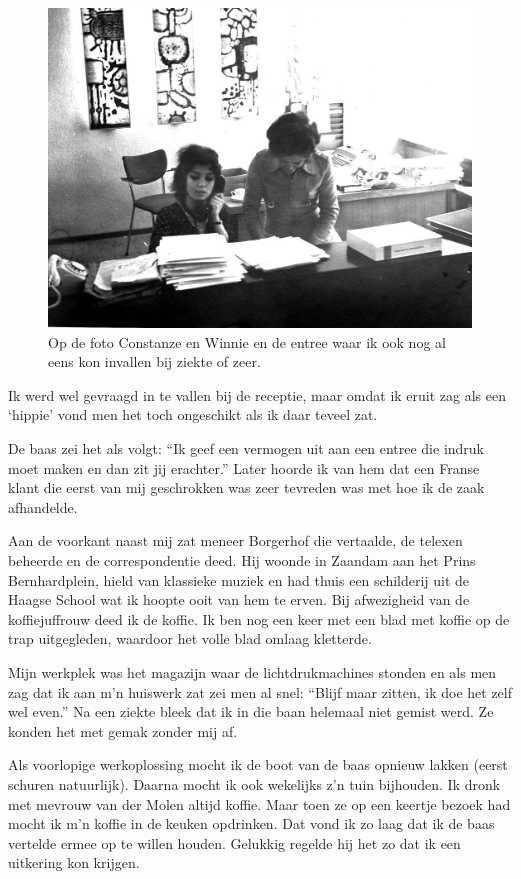 \documentclass[12pt,twoside, openright]{memoir}
\begin{document}
\begin{figure}
\centering
\includegraphics[width=\textwidth]{img/ch40/molenvd}
\caption*{\footnotesize Op de foto Constanze en Winnie en de entree waar ik ook nog al eens kon invallen bij ziekte of zeer.}
\end{figure}

Ik werd wel gevraagd in te vallen  bij de receptie, maar omdat ik eruit zag als een `hippie' vond men het toch ongeschikt als ik daar teveel zat.

De baas zei het als volgt: ``Ik geef een vermogen uit aan een entree die indruk moet maken en dan zit jij erachter.'' Later hoorde ik van hem dat een Franse klant die eerst van mij geschrokken was zeer tevreden was met hoe ik de zaak afhandelde.

Aan de voorkant naast mij zat meneer Borgerhof die vertaalde, de telexen beheerde en de correspondentie deed. Hij woonde in Zaandam aan het Prins Bernhardplein, hield van klassieke muziek en had thuis een schilderij uit de Haagse School wat ik hoopte ooit van hem te erven. Bij afwezigheid van de koffiejuffrouw deed ik de koffie. Ik ben nog een keer met een blad met koffie op de trap uitgegleden, waardoor het volle blad omlaag kletterde.

Mijn werkplek was het magazijn waar de lichtdrukmachines stonden en als men zag dat ik aan m'n huiswerk zat zei men al snel: ``Blijf maar zitten, ik doe het zelf wel even.'' Na een ziekte bleek dat ik in die baan helemaal niet gemist werd. Ze konden het met gemak zonder mij af.

Als voorlopige werkoplossing mocht ik de boot van de baas opnieuw lakken (eerst schuren natuurlijk). Daarna mocht ik ook wekelijks z’n tuin bijhouden. Ik dronk met mevrouw van der Molen altijd koffie. Maar toen ze op een keertje bezoek had mocht ik m’n koffie in de keuken opdrinken. Dat vond ik zo laag dat ik de baas vertelde ermee op te willen houden. Gelukkig regelde hij het zo dat ik een uitkering kon krijgen. 
\end{document}
